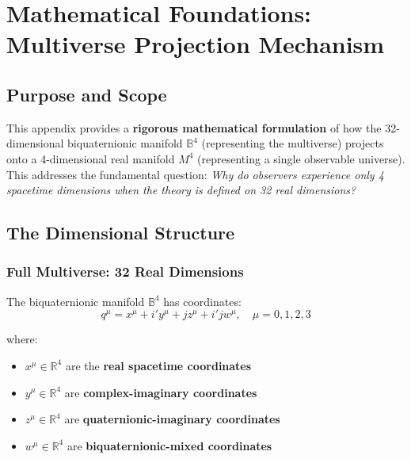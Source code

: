 
\section{Mathematical Foundations: Multiverse Projection Mechanism}
\label{app:multiverse_projection}


\SpeculativeContentWarning

\subsection{Purpose and Scope}

This appendix provides a \textbf{rigorous mathematical formulation} of how the 32-dimensional biquaternionic manifold $\mathbb{B}^4$ (representing the multiverse) projects onto a 4-dimensional real manifold $M^4$ (representing a single observable universe). This addresses the fundamental question: \emph{Why do observers experience only 4 spacetime dimensions when the theory is defined on 32 real dimensions?}

\subsection{The Dimensional Structure}

\subsubsection{Full Multiverse: 32 Real Dimensions}

The biquaternionic manifold $\mathbb{B}^4$ has coordinates:
\begin{equation}
q^{\mu} = x^{\mu} + i' y^{\mu} + j z^{\mu} + i'j w^{\mu}, \quad \mu = 0,1,2,3
\end{equation}

where:
\begin{itemize}
\item $x^{\mu} \in \mathbb{R}^4$ are the \textbf{real spacetime coordinates}
\item $y^{\mu} \in \mathbb{R}^4$ are \textbf{complex-imaginary coordinates}
\item $z^{\mu} \in \mathbb{R}^4$ are \textbf{quaternionic-imaginary coordinates}
\item $w^{\mu} \in \mathbb{R}^4$ are \textbf{biquaternionic-mixed coordinates}
\end{itemize}

